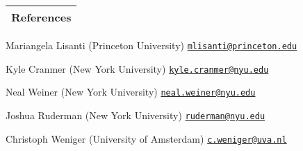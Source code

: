 \documentclass[11pt]{article}
\newenvironment{packed_itemize}{
\begin{itemize}[label=\raisebox{0.25ex}{\tiny$\bullet$}]
  \setlength{\itemsep}{3pt}
  \setlength{\parskip}{0pt}
  \setlength{\parsep}{0pt}}{\end{itemize}
}
\begin{document}

\noindent
\begin{tabular*}{\textwidth}{l@{\extracolsep{\fill}}}
\large {\sc \Large{References}}\\
\hline
\end{tabular*}\vspace{1.mm}

\begin{packed_itemize}
  \item Mariangela Lisanti (Princeton University) \hfill \href{mailto:mlisanti@princeton.edu}{\texttt{mlisanti@princeton.edu}}
  \item Kyle Cranmer (New York University) \hfill \href{mailto:kyle.cranmer@nyu.edu}{\texttt{kyle.cranmer@nyu.edu}}
  \item Neal Weiner (New York University) \hfill \href{mailto:neal.weiner@nyu.edu}{\texttt{neal.weiner@nyu.edu}}
  \item Joshua Ruderman (New York University) \hfill \href{mailto:ruderman@nyu.edu}{\texttt{ruderman@nyu.edu}}
  \item Christoph Weniger (University of Amsterdam) \hfill \href{mailto:c.weniger@uva.nl}{\texttt{c.weniger@uva.nl}}
\end{packed_itemize}


\vspace*{\fill}
\end{document}
